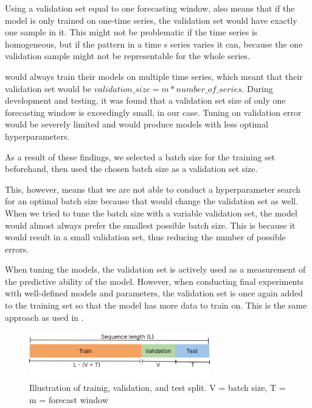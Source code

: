 Using a validation set equal to one forecasting window, also means that if the model is only trained on one-time series, the validation
set would have exactly one sample in it. This might not be problematic if the time series is homogeneous, but if the pattern in a time s
series varies it can, because the one validation sample might not be representable for the whole series.

\cite{Bandara2019} would always train their models on multiple time series,
which meant that their validation set would be $validation\_size = m * number\_of\_series$.
During development and testing, it was found that a validation set size of only one forecasting window is exceedingly small, in our case.
Tuning on validation error would be severely limited and would produce models with less optimal hyperparameters.

As a result of these findings, we selected a batch size for the training set beforehand, then
used the chosen batch size as a validation set size.

This, however, means that we are not able to conduct a hyperparameter search for an optimal batch size
because that would change the validation set as well.
When we tried to tune the batch size with a variable validation set, the model would almost always prefer the smallest possible batch size.
This is because it would result in a small validation set,
thus reducing the number of possible errors.

When tuning the models, the validation set is actively used as a measurement of the predictive ability of the model.
However, when conducting final experiments with well-defined models and parameters,
the validation set is once again added to the training set so that the model has more data to train on.
This is the same approach as used in \cite{Hewamalage2021}.




\begin{figure}[h!]
  \centering
  \includegraphics[width=0.7\textwidth]{./figs/illustrations/illustration_train_val_test_split.png}
  \hfill
  \caption{Illustration of trainig, validation, and test split. V = batch size, T = m = forecast window}
  \label{fig:train-val-test-split}
\end{figure}

